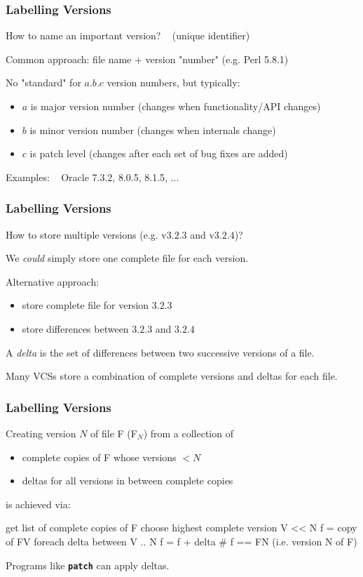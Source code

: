 \begin{frame}
\frametitle{Labelling Versions}
How to name an important version? ~ {\small (unique identifier)}

Common approach: file name + version "number" (e.g. Perl 5.8.1)

No "standard" for $a.b.c$ version numbers, but typically:
\begin{itemize}
\item  $a$ is major version number {\small (changes when functionality/API changes)}
\item  $b$ is minor version number {\small (changes when internals change)}
\item  $c$ is patch level {\small (changes after each set of bug fixes are added)}
\end{itemize}
{\small 
Examples: ~ Oracle 7.3.2, 8.0.5, 8.1.5, ... 
}
\end{frame}

\begin{frame}
\frametitle{Labelling Versions}
How to store multiple versions (e.g. v$3.2.3$ and v$3.2.4$)?

We {\em{could}} simply store one complete file for each version.

Alternative approach:
\begin{itemize}
\item  store complete file for version $3.2.3$
\item  store differences between $3.2.3$ and $3.2.4$
\end{itemize}
A {\em{delta}} is the set of differences between two successive
versions of a file.

Many VCSs store a combination of complete versions and deltas for each file.

\end{frame}

\begin{frame}[fragile]
\frametitle{Labelling Versions}
Creating version $N$ of file F (F$_{N}$) from a collection of
\begin{itemize}
\item  complete copies of F whose versions $< N$
\item  deltas for all versions in between complete copies
\end{itemize}
is achieved via:
\begin{sh}
    get list of complete copies of F
    choose highest complete version V << N
    f = copy of F{V}
    foreach delta between V .. N {
       f = f + delta
    }
    # f == F{N} (i.e. version N of F)
\end{sh}

Programs like \textbf{\tt{patch}} can apply deltas.
\end{frame}

